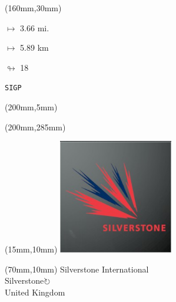 \begin{textblock*}{40mm}(160mm,30mm)%
\Large
\par$\mapsto$ 3.66 mi.
\par$\mapsto$ 5.89 km
\par$\looparrowright$ 18
\par\hfill\tiny\tt SIGP\\
\end{textblock*}
\begin{textblock*}{20mm}(200mm,5mm)%
\fbox{\thepage}
\label{SIGP}
\end{textblock*}
\begin{textblock*}{20mm}(200mm,285mm)%
\fbox{\thepage}
\end{textblock*}

\null\newpage
\begin{textblock*}{50mm}(15mm,10mm)%
\includegraphics[width=50mm]{LG/2015-05-20_00094.png}
\end{textblock*}
\begin{textblock*}{130mm}(70mm,10mm)%
{\fontsize{20}{20}\selectfont Silverstone International\\}
{\fontsize{16}{16}\selectfont Silverstone\hfill \Large$\circlearrowright$\\}
{\fontsize{12}{12}\selectfont United Kingdom\\}
\end{textblock*}
